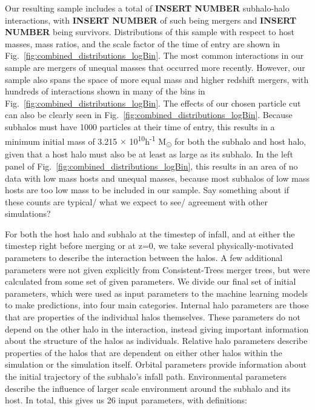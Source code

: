 \documentclass[fleqn,usenatbib]{mnras}
\newcommand\edits[1]{{\color{red}#1}}
\begin{document}
    Our resulting sample includes a total of \textbf{INSERT NUMBER} subhalo-halo interactions, with \textbf{INSERT NUMBER} of such being mergers and \textbf{INSERT NUMBER} being survivors. Distributions of this sample with respect to host masses, mass ratios, and the scale factor of the time of entry are shown in Fig.~\ref{fig:combined_distributions_logBin}. The most common interactions in our sample are mergers of unequal masses that occurred more recently. However, our sample also spans the space of more equal mass and higher redshift mergers, with hundreds of interactions shown in many of the bins in Fig.~\ref{fig:combined_distributions_logBin}. The effects of our chosen particle cut can also be clearly seen in Fig.~\ref{fig:combined_distributions_logBin}. Because subhalos must have 1000 particles at their time of entry, this results in a minimum initial mass of 3.215 $\times$ 10\textsuperscript{10}h\textsuperscript{-1} M\textsubscript{\(\odot\)} for both the subhalo and host halo, given that a host halo must also be at least as large as its subhalo. In the left panel of Fig.~\ref{fig:combined_distributions_logBin}, this results in an area of no data with low mass hosts and unequal masses, because most subhalos of low mass hosts are too low mass to be included in our sample. \edits{Say something about if these counts are typical/ what we expect to see/ agreement with other simulations?}
\par
    For both the host halo and subhalo at the timestep of infall, and at either the timestep right before merging or at z=0, we take several physically-motivated parameters to describe the interaction between the halos. A few additional parameters were not given explicitly from Consistent-Trees merger trees, but were calculated from some set of given parameters. We divide our final set of initial parameters, which were used as input parameters to the machine learning models to make predictions, into four main categories. Internal halo parameters are those that are properties of the individual halos themselves. These parameters do not depend on the other halo in the interaction, instead giving important information about the structure of the halos as individuals. Relative halo parameters describe properties of the halos that are dependent on either other halos within the simulation or the simulation itself. Orbital parameters provide information about the initial trajectory of the subhalo's infall path. Environmental parameters describe the influence of larger scale environment around the subhalo and its host. In total, this gives us 26 input parameters, with definitions:
    
\end{document}
